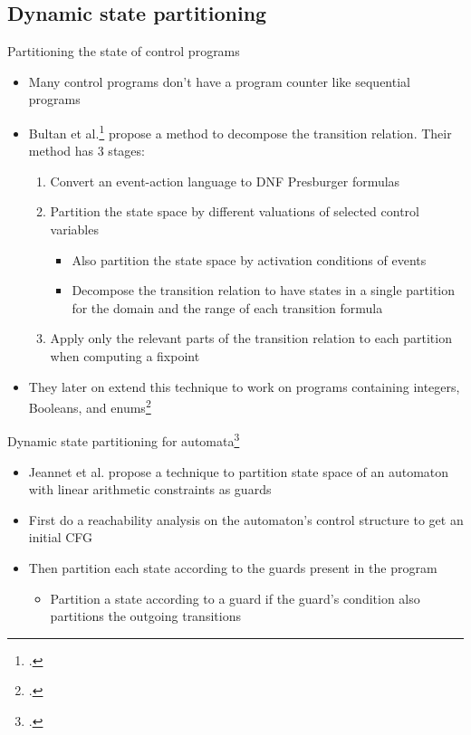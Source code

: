 \documentclass[aspectratio=169]{beamer}
\begin{document}
\subsection{Dynamic state partitioning}
\begin{frame}{Partitioning the state of control programs}\small
  \begin{itemize}[<+->]
  \item Many control programs don't have a program counter like sequential programs
  \item Bultan et al.\footcite{bultan_model-checking_1999} propose a method to decompose the transition relation. Their method has 3 stages:
    \begin{enumerate}
    \item Convert an event-action language to DNF Presburger formulas
    \item Partition the state space by different valuations of selected control variables
      \begin{itemize}
      \item Also partition the state space by activation conditions of events
      \item Decompose the transition relation to have states in a single partition for the domain and the range of each transition formula
      \end{itemize}
    \item Apply only the relevant parts of the transition relation to each partition when computing a fixpoint
    \end{enumerate}
  \item They later on extend this technique to work on programs containing integers, Booleans, and enums\footcite{bultan_composite_2000}
  \end{itemize}
\end{frame}

\begin{frame}{Dynamic state partitioning for automata\footcite{jeannet_dynamic_1999}}
  \begin{itemize}[<+->]
  \item Jeannet et al. propose a technique to partition state space of an automaton with linear arithmetic constraints as guards
  \item First do a reachability analysis on the automaton's control structure to get an initial CFG
  \item Then partition each state according to the guards present in the program
    \begin{itemize}
    \item Partition a state according to a guard if the guard's condition also partitions the outgoing transitions
    \end{itemize}
  \end{itemize}
\end{frame}
\end{document}
